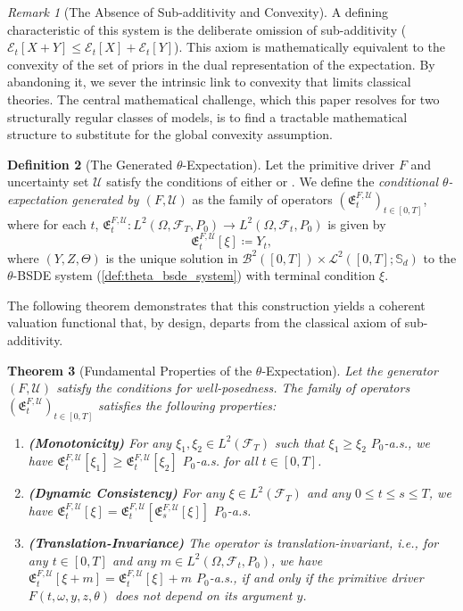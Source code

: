 \documentclass[12pt, letterpaper]{amsart}
\newcommand{\Ecal}{\mathcal{E}}
\newcommand{\Efrak}{\mathfrak{E}}
\newcommand{\Efrakgen}{\Efrak^{F, \Ucal}}
\newcommand{\Ucal}{\mathcal{U}}
\newcommand{\Bcal}{\mathcal{B}}
\newcommand{\Lcalp}[1]{\mathcal{L}^{#1}}
\newcommand{\Sd}{\mathbb{S}_d}
\theoremstyle{plain}
\newtheorem{theorem}{Theorem}[section]
\theoremstyle{definition}
\newtheorem{definition}[theorem]{Definition}
\theoremstyle{remark}
\newtheorem{remark}[theorem]{Remark}
\numberwithin{equation}{section} %
\begin{document}
\begin{remark}[The Absence of Sub-additivity and Convexity]
\label{rem:absence_of_subadditivity}
A defining characteristic of this system is the deliberate omission of sub-additivity ($\Ecal_t[X+Y] \le \Ecal_t[X] + \Ecal_t[Y]$). This axiom is mathematically equivalent to the convexity of the set of priors in the dual representation of the expectation. By abandoning it, we sever the intrinsic link to convexity that limits classical theories. The central mathematical challenge, which this paper resolves for two structurally regular classes of models, is to find a tractable mathematical structure to substitute for the global convexity assumption.
\end{remark}

\begin{definition}[The Generated \(\theta\)-Expectation]
\label{def:generated_theta_expectation}
Let the primitive driver $F$ and uncertainty set $\Ucal$ satisfy the conditions of either  or . We define the \emph{conditional $\theta$-expectation generated by $(F, \Ucal)$} as the family of operators $(\Efrakgen_t)_{t \in [0,T]}$, where for each $t$, $\Efrakgen_t: L^2(\Omega, \mathcal{F}_T, P_0) \to L^2(\Omega, \mathcal{F}_t, P_0)$ is given by
\[ \Efrakgen_t[\xi] \coloneqq Y_t, \]
where $(Y, Z, \Theta)$ is the unique solution in $\Bcal^2([0,T]) \times \Lcalp{2}([0,T]; \Sd)$ to the $\theta$-BSDE system (\cref{def:theta_bsde_system}) with terminal condition $\xi$.
\end{definition}

The following theorem demonstrates that this construction yields a coherent valuation functional that, by design, departs from the classical axiom of sub-additivity.

\begin{theorem}[Fundamental Properties of the \(\theta\)-Expectation]\label{thm:properties_of_operator}
Let the generator $(F, \Ucal)$ satisfy the conditions for well-posedness. The family of operators $(\Efrakgen_t)_{t \in [0,T]}$ satisfies the following properties:
\begin{enumerate}[label=(\roman*)]
    \item \textbf{(Monotonicity)} For any $\xi_1, \xi_2 \in L^2(\mathcal{F}_T)$ such that $\xi_1 \ge \xi_2$ $P_0$-a.s., we have $\Efrakgen_t[\xi_1] \ge \Efrakgen_t[\xi_2]$ $P_0$-a.s. for all $t \in [0,T]$.
    \item \textbf{(Dynamic Consistency)} For any $\xi \in L^2(\mathcal{F}_T)$ and any $0 \le t \le s \le T$, we have $\Efrakgen_t[\xi] = \Efrakgen_t\left[\Efrakgen_s[\xi]\right]$ $P_0$-a.s.
    \item \textbf{(Translation-Invariance)} The operator is translation-invariant, i.e., for any $t \in [0,T]$ and any $m \in L^2(\Omega, \mathcal{F}_t, P_0)$, we have $\Efrakgen_t[\xi + m] = \Efrakgen_t[\xi] + m$ $P_0$-a.s., if and only if the primitive driver $F(t,\omega,y,z,\theta)$ does not depend on its argument $y$.
\end{enumerate}
\end{theorem}
\end{document}
